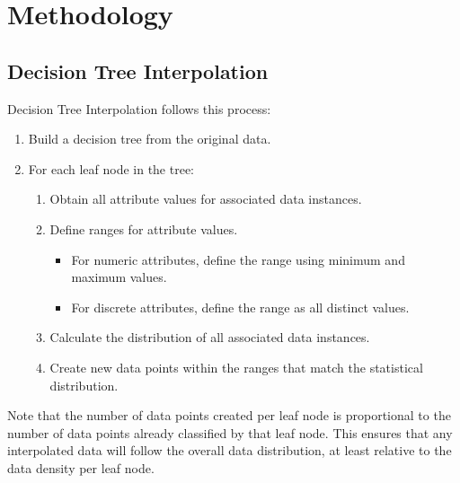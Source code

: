 \documentclass{sig-alternate}
\begin{document}
\section{Methodology}
\subsection{Decision Tree Interpolation}
Decision Tree Interpolation follows this process:
\begin{enumerate}
    \item Build a decision tree from the original data.
    \item For each leaf node in the tree:
    \begin{enumerate}
        \item Obtain all attribute values for associated data instances.
        \item Define ranges for attribute values.
        \begin{itemize}
            \item For numeric attributes, define the range using minimum and maximum values.
            \item For discrete attributes, define the range as all distinct values.
        \end{itemize}
        \item Calculate the distribution of all associated data instances.
        \item Create new data points within the ranges that match the statistical distribution.
    \end{enumerate}
\end{enumerate}
Note that the number of data points created per leaf node is proportional to the number of data points already classified by that leaf node. This ensures that any interpolated data will follow the overall data distribution, at least relative to the data density per leaf node. 
\end{document}
